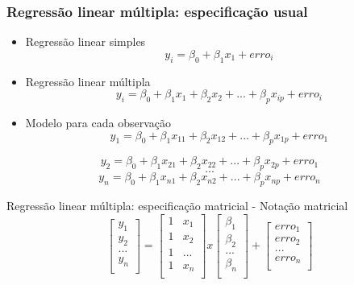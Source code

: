 \documentclass[
]{article}
\providecommand{\tightlist}{%
  \setlength{\itemsep}{0pt}\setlength{\parskip}{0pt}}
\begin{document}
\hypertarget{regressuxe3o-linear-muxfaltipla-especificauxe7uxe3o-usual}{%
\subsubsection{Regressão linear múltipla: especificação
usual}\label{regressuxe3o-linear-muxfaltipla-especificauxe7uxe3o-usual}}

\begin{itemize}
\tightlist
\item
  Regressão linear simples \[
  y_{i} = \beta_{0} +\beta_{1}x_{1} + erro_{i}
  \]
\item
  Regressão linear múltipla \[
  y_{i} = \beta_{0} + \beta_{1}x_{1} + \beta_{2}x_{2} + ... + \beta_{p}x_{ip} + erro_{i}
  \]
\item
  Modelo para cada observação
  \[y_{1} = \beta_{0} + \beta_{1}x_{11} + \beta_{2}x_{12} + ... + \beta_{p}x_{1p} + erro_{1}\]
\end{itemize}

\[y_{2} = \beta_{0} + \beta_{1}x_{21} + \beta_{2}x_{22} + ... + \beta_{p}x_{2p} + erro_{1}\]
\[...\]
\[y_{n} = \beta_{0} + \beta_{1}x_{n1} + \beta_{2}x_{n2} + ... + \beta_{p}x_{np} + erro_{n}\]

Regressão linear múltipla: especificação matricial - Notação matricial
\[
\begin{bmatrix}
y_{1}\\
y_{2}\\
...\\
y_{n}\\
\end{bmatrix}
= 
\begin{bmatrix}
1 & x_{1}\\
1 & x_{2}\\
1 & ...\\
1 & x_{n}\\
\end{bmatrix}
x 
\begin{bmatrix}
\beta_{1}\\
\beta_{2}\\
...\\
\beta_{n}\\
\end{bmatrix}
+
\begin{bmatrix}
erro_{1}\\
erro_{2}\\
...\\
erro_{n}\\
\end{bmatrix}
\]
\end{document}
